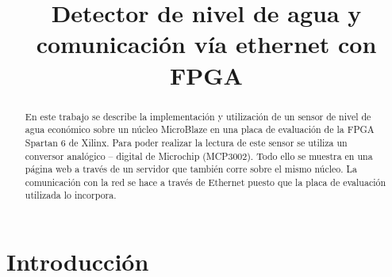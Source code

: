 \documentclass[conference,compsoc]{IEEEtran}
\begin{document}
%
\title{Detector de nivel de agua y comunicaci\'on v\'ia ethernet con FPGA}

\author{
}

\maketitle

\begin{abstract}

	En este trabajo se describe la implementaci\'on y utilizaci\'on de un sensor de nivel de agua
	econ\'omico sobre un n\'ucleo MicroBlaze en una placa de evaluaci\'on de la FPGA Spartan 6 de
	Xilinx. Para poder realizar la lectura de este sensor se utiliza un conversor anal\'ogico --
	digital de Microchip (MCP3002). Todo ello se muestra en una p\'agina web a trav\'es de un
	servidor que tambi\'en corre sobre el mismo n\'ucleo. La comunicaci\'on con la red se hace a
	trav\'es de Ethernet puesto que la placa de evaluaci\'on utilizada lo incorpora.

\end{abstract}


%
\IEEEpeerreviewmaketitle

\section{Introducci\'on}
\end{document}
